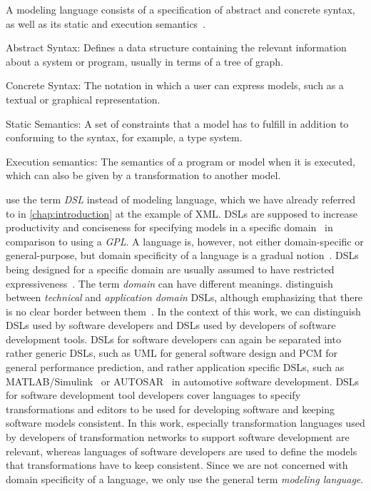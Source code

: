 A modeling language consists of a specification of abstract and concrete syntax, as well as its static and execution semantics~\cite[p.~26]{voelter2013DslEngineering}.
\begin{properdescription}
    \item[Abstract Syntax:] Defines a data structure containing the relevant information about a system or program, usually in terms of a tree of graph.
    \item[Concrete Syntax:] The notation in which a user can express models, such as a textual or graphical representation.
    \item[Static Semantics:] A set of constraints that a model has to fulfill in addition to conforming to the syntax, for example, a type system.
    \item[Execution semantics:] The semantics of a program or model when it is executed, which can also be given by a transformation to another model. 
\end{properdescription}

\textcite{voelter2013DslEngineering} use the term \emph{\gls{DSL}} instead of modeling language, which we have already referred to in \autoref{chap:introduction} at the example of \gls{XML}.
\Glspl{DSL} are supposed to increase productivity and conciseness for specifying models in a specific domain~\cite[p.~30]{voelter2013DslEngineering} in comparison to using a \emph{\gls{GPL}}.
A language is, however, not either domain-specific or general-purpose, but domain specificity of a language is a gradual notion~\cite[p.~30]{voelter2013DslEngineering}.
\Glspl{DSL} being designed for a specific domain are usually assumed to have restricted expressiveness~\cite[Chap.~2]{fowler2010dsls-Book}.
The term \emph{domain} can have different meanings.
\citeauthor{voelter2013DslEngineering} distinguish between \emph{technical} and \emph{application domain} \glspl{DSL}, although emphasizing that there is no clear border between them~\cite[p.~26]{voelter2013DslEngineering}.
In the context of this work, we can distinguish \glspl{DSL} used by software developers and \glspl{DSL} used by developers of software development tools.
\glspl{DSL} for software developers can again be separated into rather generic \glspl{DSL}, such as \gls{UML} for general software design and \gls{PCM} for general performance prediction, and rather application specific \glspl{DSL}, such as MATLAB/Simulink~\cite{simulink} or AUTOSAR~\cite{scheid2015autosar} in automotive software development.
\glspl{DSL} for software development tool developers cover languages to specify transformations and editors to be used for developing software and keeping software models consistent.
In this work, especially transformation languages used by developers of transformation networks to support software development are relevant, whereas languages of software developers are used to define the models that transformations have to keep consistent.
Since we are not concerned with domain specificity of a language, we only use the general term \emph{modeling language}.

